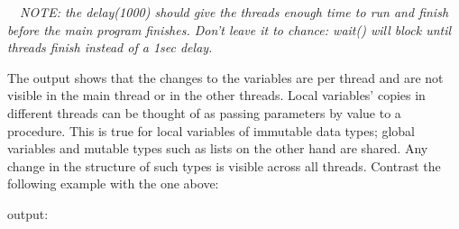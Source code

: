 \ \ \textit{NOTE: the delay(1000) should give the threads enough time to
run and finish before the main program finishes. Don{\textquoteright}t
leave it to chance: wait() will block until threads finish instead of a
1sec delay. }

The output shows that the changes to the variables are per thread and
are not visible in the main thread or in the other threads. Local
variables{\textquoteright} copies in different threads can be thought
of as passing parameters by value to a procedure. This is true for
local variables of immutable data types; global variables and mutable
types such as lists on the other hand are shared. Any change in the
structure of such types is visible across all threads. Contrast the
following example with the one above:


output:


